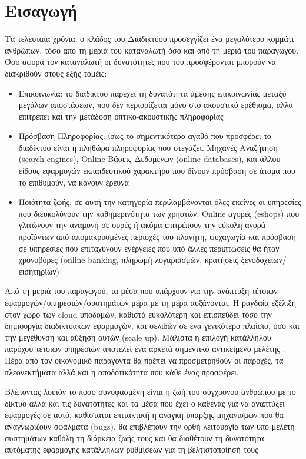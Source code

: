 \chapter{Εισαγωγή}
\label{chapter:intro}

Τα τελευταία χρόνια, ο κλάδος του Διαδικτύου προσεγγίζει ένα μεγαλύτερο κομμάτι ανθρώπων, τόσο από τη μεριά του καταναλωτή 
όσο και από τη μεριά του παραγωγού. Όσο αφορά τον καταναλωτή οι δυνατότητες που του προσφέρονται μπορούν να διακριθούν στους εξής τομέις:

\begin{itemize}
	\item Επικοινωνία: το διαδίκτυο παρέχει τη δυνατότητα άμεσης επικοινωνίας μεταξύ μεγάλων αποστάσεων, που δεν περιορίζεται μόνο στο ακουστικό
			ερέθισμα, αλλά επιτρέπει και την μετάδοση οπτικο-ακουστικής πληροφορίας
	\item Πρόσβαση Πληροφορίας: ίσως το σημεντικότερο αγαθό που προσφέρει το διαδίκτυο είναι η πληθώρα πληροφορίας
			που στεγάζει. Μηχανές Αναζήτηση (search engines), Online Βάσεις Δεδομένων (online databases),
			και άλλου είδους εφαρμογών εκπαιδευτικού χαρακτήρα που δίνουν πρόσβαση σε άτομα που το επιθυμούν, να κάνουν έρευνα
	\item Ποιότητα ζωής: σε αυτή την κατηγορία περιλαμβάνονται όλες εκείνες οι υπηρεσίες που
			διευκολύνουν την καθημερινότητα των χρηστών. Online αγορές (eshops) που γλιτώνουν την αναμονή σε ουρές ή ακόμα
			επιτρέπουν την εύκολη αγορά προϊόντων από απομακρυσμένες περιοχές του πλανήτη, ψυχαγωγία και πρόσβαση σε
			υπηρεσίες που επιταχύνουν ενέργειες που υπό άλλες περιπτώσεις θα ήταν χρονοβόρες (online banking,
			πληρωμή λογαριασμών, κρατήσεις ξενοδοχείων/εισητηρίων)
\end{itemize}

Από τη μεριά του παραγωγού, τα μέσα που υπάρχουν για την ανάπτυξη τέτοιων εφαρμογών/υπηρεσιών/συστημάτων
μέρα με τη μέρα αυξάνονται. Η ραγδαία εξέλιξη στον χώρο των cloud υποδομών, καθιστά ευκολότερη και επισπεύδει
τόσο την δημιουργία διαδικτυακών εφαρμογών, και σελιδών σε ένα γενικότερο πλαίσιο, όσο και την μεγέθυνση και αύξηση αυτών (scale up).
Μάλιστα η επιλογή κατάλληλου παρόχου τέτοιων υπηρεσιών αποτελεί ένα αρκετά σημεντικό αντικείμενο μελέτης \cite{cloud_service_provider_evaluation}.
Πέρα από τον οικονομικό παράγοντα θα πρέπει να προσμετρηθούν οι παροχές, τα πλεονεκτήματα αλλά και η αποδοτικότητα που κάθε ένας προσφέρει.

Βλέποντας λοιπόν το πόσο συνυφασμένη είναι η ζωή του σύγχρονου ανθρώπου με το δίκτυο αλλά και τις δυνατότητες και τα μέσα
που έχει ο καθένας για να αναπτύξει εφαρμογές σε αυτό, καθίσταται επιτακτική η ανάγκη ύπαρξης μηχανισμών 
που θα αναγνωρίζουν σφάλματα (bugs), θα επιβλέπουν την ορθή λειτουργία των υπό μελέτη συστημάτων καθόλη τη διάρκεια ζωής τους και θα διαθέτουν τη δυνατότητα αυτόματης εφαρμογής κατάλληλων ρυθμίσεων για τη βελτιστοποίησή τους 




